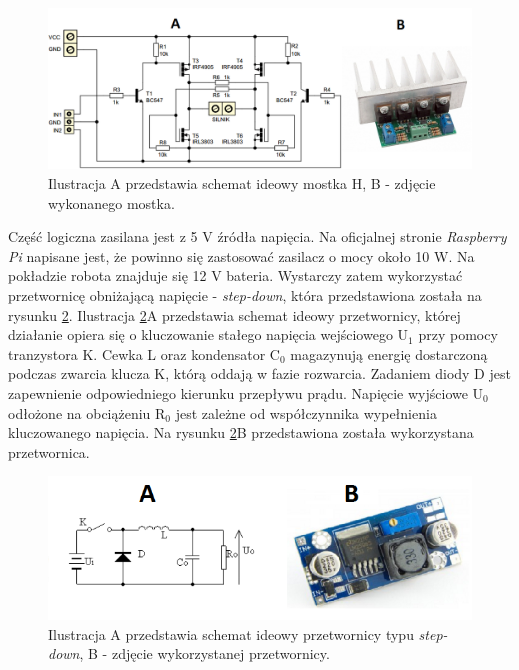 \begin{figure}[H]
    \begin{center}
      \includegraphics[scale=0.45]{imgs/mostek_h_schemat.png}
 	\caption[Schemat mostka H.]{\small{Ilustracja A przedstawia schemat ideowy mostka H, B - zdjęcie wykonanego mostka.}\footnotemark}
	\label{mostek_h_sch}
    \end{center}
  \end{figure}  
  	  
Część logiczna zasilana jest z 5 V źródła napięcia. Na oficjalnej stronie \textit{Raspberry Pi} napisane jest, że powinno się zastosować zasilacz o mocy około 10 W. Na pokładzie robota znajduje się 12 V bateria. Wystarczy zatem wykorzystać przetwornicę obniżającą napięcie - \textit{step-down}, która przedstawiona została na rysunku \ref{p_dc_dc_sch}. Ilustracja \ref{p_dc_dc_sch}A przedstawia schemat ideowy przetwornicy, której działanie opiera się o kluczowanie stałego napięcia wejściowego U$_1$ przy pomocy tranzystora K. Cewka L oraz kondensator C$_0$ magazynują energię dostarczoną podczas zwarcia klucza K, którą oddają w fazie rozwarcia. Zadaniem diody D jest zapewnienie odpowiedniego kierunku przepływu prądu. Napięcie wyjściowe U$_0$ odłożone na obciążeniu R$_0$ jest zależne od współczynnika wypełnienia kluczowanego napięcia. Na rysunku \ref{p_dc_dc_sch}B przedstawiona została wykorzystana przetwornica. 
\begin{figure}[H]
    \begin{center}
      \includegraphics[scale=0.82]{imgs/przetwornica.png}
 	\caption[Przetwornica obniżająca napięcie DC/DC]{\small{Ilustracja A przedstawia schemat ideowy przetwornicy typu \textit{step-down}}\footnotemark \small{, B - zdjęcie wykorzystanej przetwornicy.}\footnotemark}
	\label{p_dc_dc_sch}
    \end{center}
  \end{figure}  

